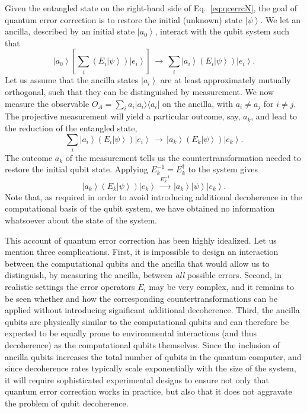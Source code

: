 \documentclass[aps,pra,reprint,amsmath,amssymb,showpacs,nofootinbib,floatfix,onecolumn,12pt]{revtex4-1}
\newcommand{\ket}[1]{\left\vert{#1}\right\rangle}
\newcommand{\ketbra}[2]{\ensuremath{|{#1 \rangle}{\langle #2}|}}
\begin{document}
Given the entangled state on the right-hand side of Eq.~\eqref{eq:qcerrcN}, the goal of quantum error correction is to restore the initial (unknown) state $\ket{\psi}$. We let an ancilla, described by an initial state $\ket{a_0}$, interact with the qubit system such that
%
\begin{equation}\label{eq:errfsyn}
  \ket{a_0} \left[ \sum_{i} \left( E_i   \ket{\psi} \right)
    \ket{e_i} \right] \, \longrightarrow \, 
  \sum_{i} \ket{a_i} \left( E_i \ket{\psi} \right)
  \ket{e_i}.
\end{equation}
%
Let us assume that the ancilla states $\ket{a_i}$ are at least approximately mutually orthogonal, such that they can be distinguished by measurement. We now measure the observable $O_A = \sum_i a_i \ketbra{a_i}{a_i}$ on the ancilla, with $a_i \not= a_j$ for $i\not= j$. The projective measurement will yield a particular outcome, say, $a_k$, and lead to the reduction of the entangled state,
%
\begin{equation}
\label{eq:fijvdnjvcsh411}
\sum_{i} \ket{a_i} \left( E_i \ket{\psi} \right)
\ket{e_i} \, \longrightarrow \, \ket{a_k}
\left( E_k \ket{\psi} \right) 
\ket{e_k}.
\end{equation}
%
The outcome $a_k$ of the measurement tells us the countertransformation needed to restore the initial qubit state. Applying $E_k^{-1}=E_k^\dagger$ to the system gives
%
\begin{equation}
  \ket{a_k} \left( E_k \ket{\psi} \right) \ket{e_k} \,
  \xrightarrow{E_k^{-1}} \,  
  \ket{a_k} \ket{\psi} \ket{e_k}.
\end{equation}
%
Note that, as required in order to avoid introducing additional decoherence in the computational basis of the qubit system, we have obtained no information whatsoever about the state of the system. 

This account of quantum error correction has been highly idealized. Let us mention three complications. First, it is impossible to design an interaction between the computational qubits and the ancilla that would allow us to distinguish, by measuring the ancilla, between \emph{all} possible errors. Second, in realistic settings the error operators $E_i$ may be very complex, and it remains to be seen whether and how the corresponding countertransformations can be applied without introducing significant additional decoherence. Third, the ancilla qubits are physically similar to the computational qubits and can therefore be expected to be equally prone to environmental interactions (and thus decoherence) as the computational qubits themselves. Since the inclusion of ancilla qubits increases the total number of qubits in the quantum computer, and since decoherence rates typically scale exponentially with the size of
the system, it will require sophisticated experimental designs to ensure not only that quantum error correction works in practice, but also that it does not aggravate the problem of qubit decoherence.
\end{document}
